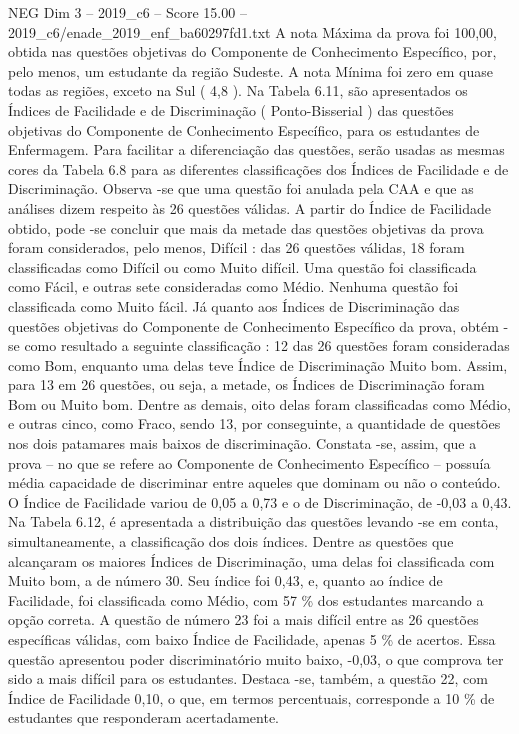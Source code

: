 \begin{textsample}{NEG Dim 3 – 2019\_c6 – Score 15.00 – 2019\_c6/enade\_2019\_enf\_ba60297fd1.txt}
A nota Máxima da prova foi 100,00, obtida nas questões objetivas do Componente de Conhecimento Específico, por, pelo menos, um estudante da região Sudeste.
A nota Mínima foi zero em quase todas as regiões, exceto na Sul ( 4,8 ).
Na Tabela 6.11, são apresentados os Índices de Facilidade e de Discriminação ( Ponto-Bisserial ) das questões objetivas do Componente de Conhecimento Específico, para os estudantes de Enfermagem.
Para facilitar a diferenciação das questões, serão usadas as mesmas cores da Tabela 6.8 para as diferentes classificações dos Índices de Facilidade e de Discriminação.
Observa -se que uma questão foi anulada pela CAA e que as análises dizem respeito às 26 questões válidas.
A partir do Índice de Facilidade obtido, pode -se concluir que mais da metade das questões objetivas da prova foram considerados, pelo menos, Difícil : das 26 questões válidas, 18 foram classificadas como Difícil ou como Muito difícil.
Uma questão foi classificada como Fácil, e outras sete consideradas como Médio.
Nenhuma questão foi classificada como Muito fácil.
Já quanto aos Índices de Discriminação das questões objetivas do Componente de Conhecimento Específico da prova, obtém -se como resultado a seguinte classificação : 12 das 26 questões foram consideradas como Bom, enquanto uma delas teve Índice de Discriminação Muito bom.
Assim, para 13 em 26 questões, ou seja, a metade, os Índices de Discriminação foram Bom ou Muito bom.
Dentre as demais, oito delas foram classificadas como Médio, e outras cinco, como Fraco, sendo 13, por conseguinte, a quantidade de questões nos dois patamares mais baixos de discriminação.
Constata -se, assim, que a prova – no que se refere ao Componente de Conhecimento Específico – possuía média capacidade de discriminar entre aqueles que dominam ou não o conteúdo.
O Índice de Facilidade variou de 0,05 a 0,73 e o de Discriminação, de -0,03 a 0,43.
Na Tabela 6.12, é apresentada a distribuição das questões levando -se em conta, simultaneamente, a classificação dos dois índices.
Dentre as questões que alcançaram os maiores Índices de Discriminação, uma delas foi classificada com Muito bom, a de número 30.
Seu índice foi 0,43, e, quanto ao índice de Facilidade, foi classificada como Médio, com 57 \% dos estudantes marcando a opção correta.
A questão de número 23 foi a mais difícil entre as 26 questões específicas válidas, com baixo Índice de Facilidade, apenas 5 \% de acertos.
Essa questão apresentou poder discriminatório muito baixo, -0,03, o que comprova ter sido a mais difícil para os estudantes.
Destaca -se, também, a questão 22, com Índice de Facilidade 0,10, o que, em termos percentuais, corresponde a 10 \% de estudantes que responderam acertadamente.

\end{textsample}
